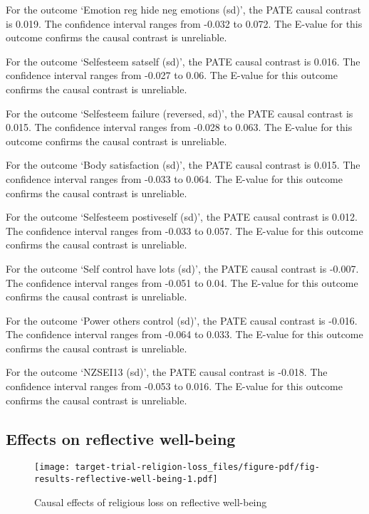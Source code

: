 \documentclass[
  singlecolumn]{report}
\begin{document}
For the outcome `Emotion reg hide neg emotions (sd)', the PATE causal
contrast is 0.019. The confidence interval ranges from -0.032 to 0.072.
The E-value for this outcome confirms the causal contrast is unreliable.

For the outcome `Selfesteem satself (sd)', the PATE causal contrast is
0.016. The confidence interval ranges from -0.027 to 0.06. The E-value
for this outcome confirms the causal contrast is unreliable.

For the outcome `Selfesteem failure (reversed, sd)', the PATE causal
contrast is 0.015. The confidence interval ranges from -0.028 to 0.063.
The E-value for this outcome confirms the causal contrast is unreliable.

For the outcome `Body satisfaction (sd)', the PATE causal contrast is
0.015. The confidence interval ranges from -0.033 to 0.064. The E-value
for this outcome confirms the causal contrast is unreliable.

For the outcome `Selfesteem postiveself (sd)', the PATE causal contrast
is 0.012. The confidence interval ranges from -0.033 to 0.057. The
E-value for this outcome confirms the causal contrast is unreliable.

For the outcome `Self control have lots (sd)', the PATE causal contrast
is -0.007. The confidence interval ranges from -0.051 to 0.04. The
E-value for this outcome confirms the causal contrast is unreliable.

For the outcome `Power others control (sd)', the PATE causal contrast is
-0.016. The confidence interval ranges from -0.064 to 0.033. The E-value
for this outcome confirms the causal contrast is unreliable.

For the outcome `NZSEI13 (sd)', the PATE causal contrast is -0.018. The
confidence interval ranges from -0.053 to 0.016. The E-value for this
outcome confirms the causal contrast is unreliable.

\hypertarget{effects-on-reflective-well-being}{%
\subsection{Effects on reflective
well-being}\label{effects-on-reflective-well-being}}

\begin{figure}

{\centering \texttt{[image: target-trial-religion-loss\_files/figure-pdf/fig-results-reflective-well-being-1.pdf]}

}

\caption{\label{fig-results-reflective-well-being}Causal effects of
religious loss on reflective well-being}

\end{figure}
\end{document}
